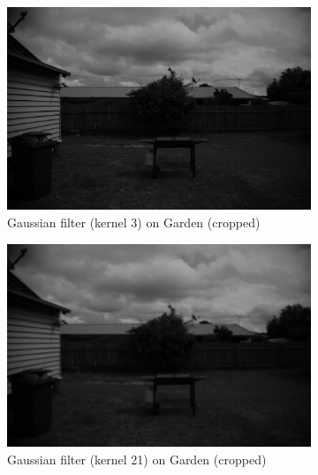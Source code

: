 \documentclass{article}
\begin{document}
\begin{figure}[H]
	\begin{subfigure}{0.3\textwidth}
		\includegraphics[trim={20cm 25cm 25cm 10cm},clip,width=\textwidth]{Generated/Garden_gaussian3filter.png}
		\caption{Gaussian filter (kernel 3) on Garden (cropped)}
		\label{fig:gaussian3_Garden}
	\end{subfigure}
	\hfill
	\begin{subfigure}{0.3\textwidth}
		\includegraphics[trim={20cm 25cm 25cm 10cm},clip,width=\textwidth]{Generated/Garden_gaussian21filter.png}
		\caption{Gaussian filter (kernel 21) on Garden (cropped)}
		\label{fig:gaussian21_Garden}
	\end{subfigure}
	\hfill
	\begin{subfigure}{0.3\textwidth}

\end{subfigure}
\end{figure}
\end{document}
